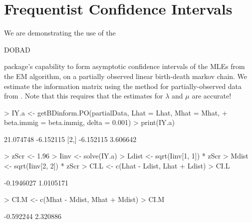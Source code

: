 \documentclass[12pt]{article}
\begin{document}
\part{Frequentist Confidence Intervals}

We are demonstrating the use of the
\begin{verb}
DOBAD
\end{verb}
package's capability to 
form asymptotic confidence intervals of the MLEs from the EM algorithm,
on a partially observed linear birth-death markov chain.  We estimate
the information matrix using the method for partially-observed data 
from \citet{Louis1982}.  Note that this requires that the estimates for $\lambda$
and $\mu$ are accurate!

\begin{Schunk}
\begin{Sinput}
> IY.a <- getBDinform.PO(partialData, Lhat = Lhat, Mhat = Mhat, 
+    beta.immig = beta.immig, delta = 0.001)
> print(IY.a)
\end{Sinput}
\begin{Soutput}
          [,1]      [,2]
[1,] 21.074748 -6.152115
[2,] -6.152115  3.606642
\end{Soutput}
\begin{Sinput}
> zScr <- 1.96
> Iinv <- solve(IY.a)
> Ldist <- sqrt(Iinv[1, 1]) * zScr
> Mdist <- sqrt(Iinv[2, 2]) * zScr
> CI.L <- c(Lhat - Ldist, Lhat + Ldist)
> CI.L
\end{Sinput}
\begin{Soutput}
[1] -0.1946027  1.0105171
\end{Soutput}
\begin{Sinput}
> CI.M <- c(Mhat - Mdist, Mhat + Mdist)
> CI.M
\end{Sinput}
\begin{Soutput}
[1] -0.592244  2.320886
\end{Soutput}
\end{Schunk}



\end{document}
